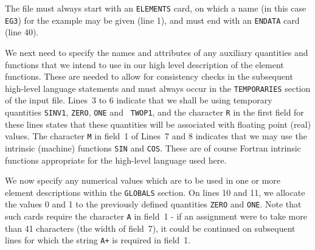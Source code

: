 \documentclass[a4paper]{article}
\begin{document}
The file  must always start  with an  {\tt ELEMENTS}
card,
on which a name (in this case {\tt EG3}) for  the example may be
given (line 1), and must end with an {\tt ENDATA}
card (line 40).

We  next need to specify the   names and  attributes of  any auxiliary
quantities  and functions that  we intend  to use   in  our high level
description  of the element  functions.
These are needed to  allow for consistency
checks  in  the subsequent high-level language statements
and must always occur in the  {\tt  TEMPORARIES}
section of the input  file.  Lines~3  to  6 indicate that  we shall be
using temporary quantities {\tt SINV1}, {\tt ZERO}, {\tt ONE} and {\tt
TWOP1}, and the character {\tt  R} in the  first field for  these lines
states that  these quantities will  be  associated with floating point
(real)  values. The character  {\tt M}   in field~1 of  Lines~7  and 8
indicates that we may  use the intrinsic (machine)
functions  {\tt SIN}
and {\tt COS}.  These are   of   course Fortran
intrinsic functions appropriate for the high-level language used here.

We now  specify any numerical  values which are to  be used in one  or
more element
descriptions within  the {\tt GLOBALS}
section.  On lines 10  and 11, we  allocate the values 0  and 1 to the
previously defined quantities {\tt ZERO} and {\tt ONE}. Note that such
cards
require the character {\tt A} in field~1 - if an assignment were
to take more than 41 characters  (the width  of  field~7), it could be
continued  on  subsequent lines  for  which the  string   {\tt  A+} is
required in field~1.
\end{document}
